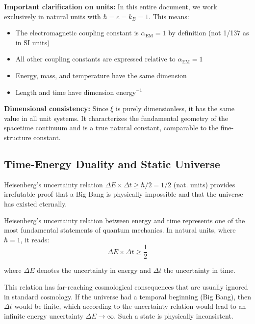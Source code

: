 	\textbf{Important clarification on units:}
	In this entire document, we work exclusively in natural units with $\hbar = c = k_B = 1$. This means:
	\begin{itemize}
		\item The electromagnetic coupling constant is $\alpha_{\text{EM}} = 1$ by definition (not 1/137 as in SI units)
		\item All other coupling constants are expressed relative to $\alpha_{\text{EM}} = 1$
		\item Energy, mass, and temperature have the same dimension
		\item Length and time have dimension energy$^{-1}$
	\end{itemize}
	
	\textbf{Dimensional consistency:} Since $\xi$ is purely dimensionless, it has the same value in all unit systems. It characterizes the fundamental geometry of the spacetime continuum and is a true natural constant, comparable to the fine-structure constant.
	
	\subsection{Time-Energy Duality and Static Universe}
	
	\begin{important}
		Heisenberg's uncertainty relation $\Delta E \times \Delta t \geq \hbar/2 = 1/2$ (nat. units) provides irrefutable proof that a Big Bang is physically impossible and that the universe has existed eternally.
	\end{important}
	
	Heisenberg's uncertainty relation between energy and time represents one of the most fundamental statements of quantum mechanics. In natural units, where $\hbar = 1$, it reads:
	\begin{equation}
		\Delta E \times \Delta t \geq \frac{1}{2}
	\end{equation}
	
	where $\Delta E$ denotes the uncertainty in energy and $\Delta t$ the uncertainty in time.
	
	This relation has far-reaching cosmological consequences that are usually ignored in standard cosmology. If the universe had a temporal beginning (Big Bang), then $\Delta t$ would be finite, which according to the uncertainty relation would lead to an infinite energy uncertainty $\Delta E \to \infty$. Such a state is physically inconsistent.
	
